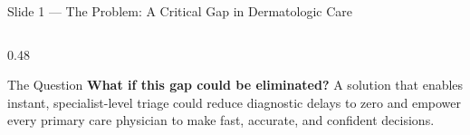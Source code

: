 \documentclass[aspectratio=169, 9pt]{beamer}
\begin{document}
\begin{frame}{Slide 1 --- The Problem: A Critical Gap in Dermatologic Care}
\begin{columns}[T]
\begin{column}{0.48\textwidth}
      \vspace{0.4em}
      \begin{exampleblock}{The Question}
        \small
        \textbf{What if this gap could be eliminated?} A solution
        that enables instant, specialist-level triage could reduce
        diagnostic delays to zero and empower every primary care
        physician to make fast, accurate, and confident decisions.
      \end{exampleblock}
    \end{column}

  \end{columns}

\end{frame}

\end{document}
